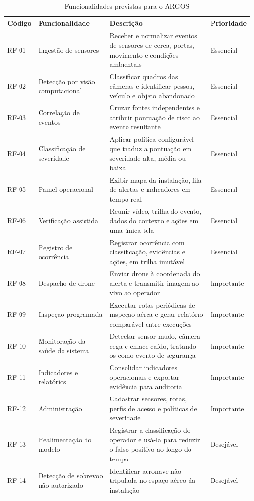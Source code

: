 \documentclass[12pt,a4paper,oneside]{article}
\newcommand{\fonte}[1]{\par\vspace{5pt}{\footnotesize\singlespacing Fonte: #1\par}}
\newcommand{\cab}[1]{\textbf{\footnotesize #1}}
\begin{document}
\begin{table}[H]
\centering
\caption{Funcionalidades previstas para o ARGOS}
\label{tab:rf}
{\small\singlespacing
\begin{tabularx}{\textwidth}{L{1.5cm} L{4.0cm} X L{2.2cm}}
\toprule
\cab{Código} & \cab{Funcionalidade} & \cab{Descrição} & \cab{Prioridade} \\
\midrule
RF-01 & Ingestão de sensores & Receber e normalizar eventos de sensores de
cerca, portas, movimento e condições ambientais & Essencial \\
RF-02 & Detecção por visão computacional & Classificar quadros das câmeras e
identificar pessoa, veículo e objeto abandonado & Essencial \\
RF-03 & Correlação de eventos & Cruzar fontes independentes e atribuir
pontuação de risco ao evento resultante & Essencial \\
RF-04 & Classificação de severidade & Aplicar política configurável que traduz
a pontuação em severidade alta, média ou baixa & Essencial \\
RF-05 & Painel operacional & Exibir mapa da instalação, fila de alertas e
indicadores em tempo real & Essencial \\
RF-06 & Verificação assistida & Reunir vídeo, trilha do evento, dados do
contexto e ações em uma única tela & Essencial \\
RF-07 & Registro de ocorrência & Registrar ocorrência com classificação,
evidências e ações, em trilha imutável & Essencial \\
RF-08 & Despacho de drone & Enviar drone à coordenada do alerta e transmitir
imagem ao vivo ao operador & Importante \\
RF-09 & Inspeção programada & Executar rotas periódicas de inspeção aérea e
gerar relatório comparável entre execuções & Importante \\
RF-10 & Monitoração da saúde do sistema & Detectar sensor mudo, câmera cega e
enlace caído, tratando-os como evento de segurança & Importante \\
RF-11 & Indicadores e relatórios & Consolidar indicadores operacionais e
exportar evidência para auditoria & Importante \\
RF-12 & Administração & Cadastrar sensores, rotas, perfis de acesso e políticas
de severidade & Importante \\
RF-13 & Realimentação do modelo & Registrar a classificação do operador e usá-la
para reduzir o falso positivo ao longo do tempo & Desejável \\
RF-14 & Detecção de sobrevoo não autorizado & Identificar aeronave não
tripulada no espaço aéreo da instalação & Desejável \\
\bottomrule
\end{tabularx}}
\fonte{elaborado pelos autores (2026).}
\end{table}
\end{document}
